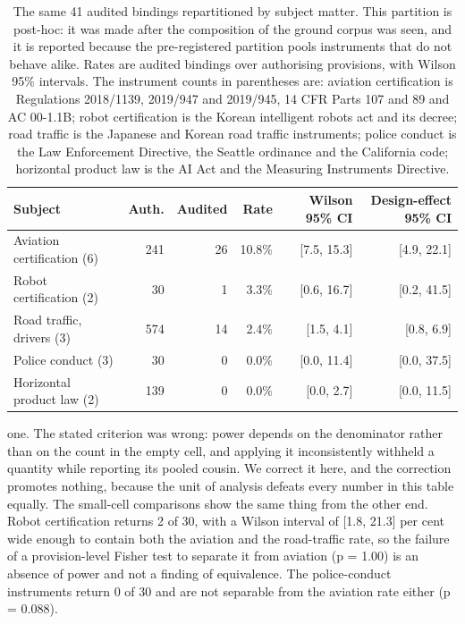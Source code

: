 \begin{table}[!htb]
\centering
\caption{The same 41 audited bindings repartitioned by subject matter. This partition is post-hoc: it was made after the composition of the ground corpus was seen, and it is reported because the pre-registered partition pools instruments that do not behave alike. Rates are audited bindings over authorising provisions, with Wilson 95\% intervals. The instrument counts in parentheses are: aviation certification is Regulations 2018/1139, 2019/947 and 2019/945, 14 CFR Parts 107 and 89 and AC 00-1.1B; robot certification is the Korean intelligent robots act and its decree; road traffic is the Japanese and Korean road traffic instruments; police conduct is the Law Enforcement Directive, the Seattle ordinance and the California code; horizontal product law is the AI Act and the Measuring Instruments Directive.}
\label{tab:t8}
\small
\begin{tabular}{@{}lrrrrr@{}}
\toprule
Subject & Auth. & Audited & Rate & Wilson 95\% CI & Design-effect 95\% CI \\
\midrule
Aviation certification (6) & 241 & 26 & 10.8\% & [7.5, 15.3] & [4.9, 22.1] \\
Robot certification (2) & 30 & 1 & 3.3\% & [0.6, 16.7] & [0.2, 41.5] \\
Road traffic, drivers (3) & 574 & 14 & 2.4\% & [1.5, 4.1] & [0.8, 6.9] \\
Police conduct (3) & 30 & 0 & 0.0\% & [0.0, 11.4] & [0.0, 37.5] \\
Horizontal product law (2) & 139 & 0 & 0.0\% & [0.0, 2.7] & [0.0, 11.5] \\
\bottomrule
\end{tabular}
\end{table}

one. The stated criterion was wrong: power depends on the denominator rather than on the count in the empty cell, and applying it inconsistently withheld a quantity while reporting its pooled cousin. We correct it here, and the correction promotes nothing, because the unit of analysis defeats every number in this table equally. The small-cell comparisons show the same thing from the other end. Robot certification returns 2 of 30, with a Wilson interval of [1.8, 21.3] per cent wide enough to contain both the aviation and the road-traffic rate, so the failure of a provision-level Fisher test to separate it from aviation (p = 1.00) is an absence of power and not a finding of equivalence. The police-conduct instruments return 0 of 30 and are not separable from the aviation rate either (p = 0.088).

